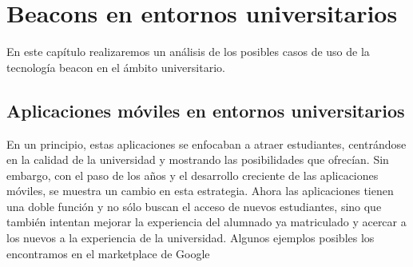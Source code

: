 %
%
%
%


\chapter{Beacons en entornos universitarios} \label{chap:BeaconsEntornosUniversitarios}  


En este capítulo realizaremos un análisis de los posibles casos de uso de la tecnología beacon en el ámbito universitario.

 
\section{Aplicaciones móviles en entornos universitarios}


En un principio, estas aplicaciones se enfocaban a atraer estudiantes, centrándose en la calidad de la universidad y mostrando las posibilidades que ofrecían. Sin embargo, con el paso de los años y el desarrollo creciente de las aplicaciones móviles, se muestra un cambio en esta estrategia. Ahora las aplicaciones tienen una doble función y no sólo buscan el acceso de nuevos estudiantes, sino que también intentan mejorar la experiencia del alumnado ya matriculado y acercar a los nuevos a la experiencia de la universidad. 
Algunos ejemplos posibles los encontramos en el marketplace de Google \cite{URL::galileo, URL::valladolid, URL::oviedo}

